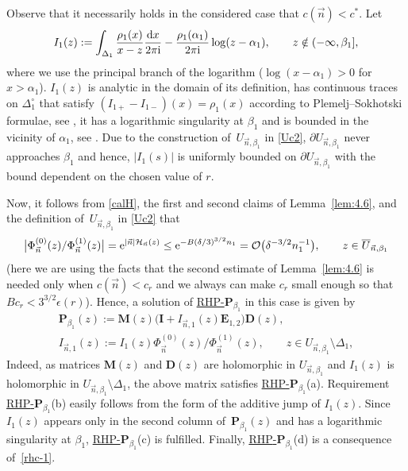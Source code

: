 \documentclass[pdftex]{sigma}
\numberwithin{equation}{section}
\newcommand{\n}{{\vec n}}
\newcommand{\ic}{\mathrm{i}}
\newcommand{\rhp} {\textnormal{RHP}-${\boldsymbol P}$}
\begin{document}
Observe that it necessarily holds in the considered case that $ c(\n) < c^* $. Let
\[
I_1(z) := \int_{\Delta_1}\frac{\rho_1(x)}{x-z}\frac{{\rm d}x}{2\pi\ic} - \frac{\rho_1(\alpha_1)}{2\pi\ic}\log(z-\alpha_1), \qquad z\notin(-\infty,\beta_1],
\]
where we use the principal branch of the logarithm ($\log(x-\alpha_1)>0 $ for $ x>\alpha_1 $). $ I_1(z) $ is analytic in the domain of its definition, has continuous traces on $ \Delta_1^\circ $ that satisfy $ (I_{1+} - I_{1-})(x) = \rho_1(x) $ according to Plemelj--Sokhotski formulae, see \cite[Section~I.4.2]{Gakhov}, it has a logarithmic singularity at $ \beta_1 $ and is bounded in the vicinity of $ \alpha_1 $, see \cite[Section~I.8.2]{Gakhov}. Due to the construction of~$ U_{\n,\beta_1} $ in \eqref{Uc2}, $ \partial U_{\n,\beta_1} $ never approaches $ \beta_1 $ and hence, $ |I_1(s)| $ is uniformly bounded on $ \partial U_{\n,\beta_1} $ with the bound dependent on the chosen value of $ r $.

Now, it follows from \eqref{calH}, the first and second claims of Lemma~\ref{lem:4.6}, and the definition of~$ U_{\n,\beta_1} $ in \eqref{Uc2} that
\begin{equation}
\label{rhc-1}
\big|\Phi_\n^{(0)}(z)/\Phi_\n^{(1)}(z)\big| = {\rm e}^{|\n| \mathcal H_\n(z)} \leq {\rm e}^{-B(\delta/3)^{3/2}n_1} = \mathcal O\bigl( \delta^{-3/2} n_1^{-1}\bigr), \qquad z\in \overline U_{\n,\beta_1}
\end{equation}
(here we are using the facts that the second estimate of Lemma~\ref{lem:4.6} is needed only when $ c(\n) < c_r $ and we always can make $ c_r $ small enough so that $ Bc_r < 3^{3/2}\epsilon(r) $). Hence, a solution of \hyperref[rhp]{\rhp$_{\beta_1}$} in this case is given by
\begin{gather}
\boldsymbol P_{\beta_1}(z) := \boldsymbol M(z) \bigl( \boldsymbol I + I_{\n,1}(z) \boldsymbol E_{1,2} \bigr) \boldsymbol D(z),\nonumber \\
I_{\n,1} (z) := I_1(z)\Phi_\n^{(0)}(z)/\Phi_\n^{(1)}(z),
\qquad z\in U_{\n,\beta_1}\setminus\Delta_1,\label{rhc-2}
\end{gather}
Indeed, as matrices $ \boldsymbol M(z) $ and $ \boldsymbol D(z) $ are holomorphic in $ U_{\n,\beta_1} $ and $ I_1(z) $ is holomorphic in $ U_{\n,\beta_1}\setminus\Delta_1 $, the above matrix satisfies \hyperref[rhp]{\rhp$_{\beta_1}$}(a). Requirement \hyperref[rhp]{\rhp$_{\beta_1}$}(b) easily follows from the form of the additive jump of $ I_1(z) $. Since $ I_1(z) $ appears only in the second column of~$ \boldsymbol P_{\beta_1}(z) $ and has a logarithmic singularity at $ \beta_1 $, \hyperref[rhp]{\rhp$_{\beta_1}$}(c) is fulfilled. Finally, \hyperref[rhp]{\rhp$_{\beta_1}$}(d) is a consequence of~\eqref{rhc-1}.
\end{document}
